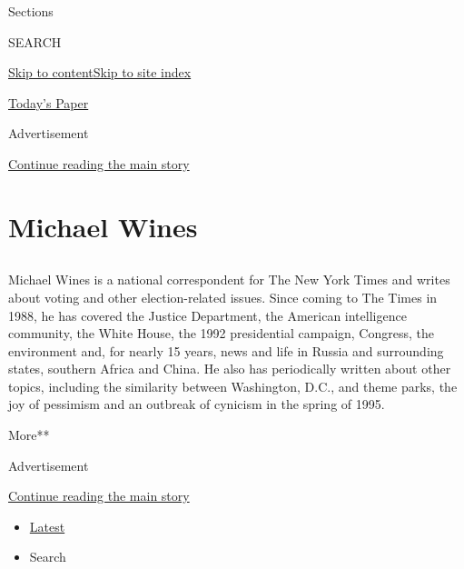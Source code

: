 Sections

SEARCH

\protect\hyperlink{site-content}{Skip to
content}\protect\hyperlink{site-index}{Skip to site index}

\href{https://myaccount.nytimes.com/auth/login?response_type=cookie\&client_id=vi}{}

\href{https://www.nytimes.com/section/todayspaper}{Today's Paper}

Advertisement

\protect\hyperlink{after-top}{Continue reading the main story}

\hypertarget{michael-wines}{%
\section{Michael Wines}\label{michael-wines}}

\subsection{}

Michael Wines is a national correspondent for The New York Times and
writes about voting and other election-related issues. Since coming to
The Times in 1988, he has covered the Justice Department, the American
intelligence community, the White House, the 1992 presidential campaign,
Congress, the environment and, for nearly 15 years, news and life in
Russia and surrounding states, southern Africa and China. He also has
periodically written about other topics, including the similarity
between Washington, D.C., and theme parks, the joy of pessimism and an
outbreak of cynicism in the spring of 1995.

More**

Advertisement

\protect\hyperlink{after-mid1}{Continue reading the main story}

\begin{itemize}
\tightlist
\item
  \protect\hyperlink{stream-panel}{Latest}
\item
  Search
\end{itemize}

